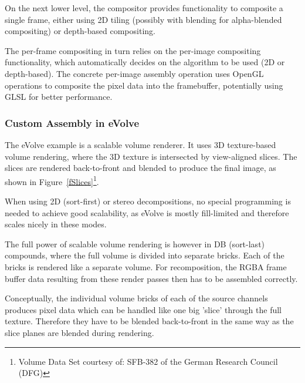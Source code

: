 \documentclass[10pt,a4]{scrartcl}
\newcommand{\fig}[1]{Figure~\ref{#1}}
\begin{document}
On the next lower level, the compositor provides functionality to
composite a single frame, either using 2D tiling (possibly with blending
for alpha-blended compositing) or depth-based compositing. 

The per-frame compositing in turn relies on the per-image compositing
functionality, which automatically decides on the algorithm to be used
(2D or depth-based). The concrete per-image assembly operation uses
OpenGL operations to composite the pixel data into the framebuffer,
potentially using GLSL for better performance.


\subsubsection{Custom Assembly in eVolve}

The \textsf{eVolve} example is a scalable volume renderer. It uses 3D
texture-based volume rendering, where the 3D texture is intersected by
view-aligned slices. The slices are rendered back-to-front and blended
to produce the final image, as shown in \fig{fSlices}\footnote{Volume
  Data Set courtesy of: SFB-382 of the German Research Council (DFG)}.

When using 2D (sort-first) or stereo decompositions, no special
programming is needed to achieve good scalability, as \textsf{eVolve} is
mostly fill-limited and therefore scales nicely in these modes. 

The full power of scalable volume rendering is however in DB (sort-last)
compounds, where the full volume is divided into separate bricks. Each
of the bricks is rendered like a separate volume. For recomposition, the
\textsf{RGBA} frame buffer data resulting from these render passes then
has to be assembled correctly. 

Conceptually, the individual volume bricks of each of the source
channels produces pixel data which can be handled like one big 'slice'
through the full texture. Therefore they have to be blen\-ded
back-to-front in the same way as the slice planes are blended during
rendering.
\end{document}
